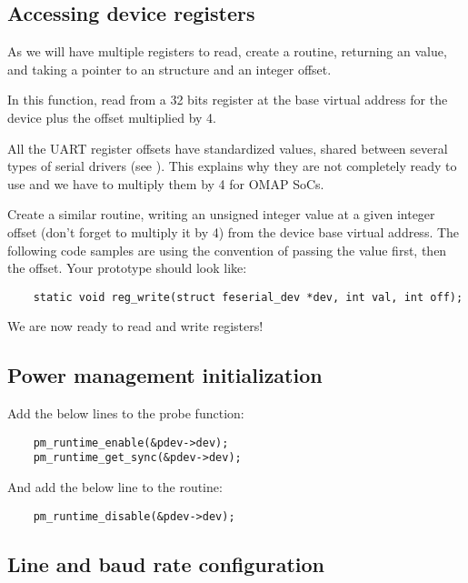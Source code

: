 \subsection{Accessing device registers}

As we will have multiple registers to read, create a 
routine, returning an  value, and  taking a 
pointer to an  structure and an  integer
offset.

In this function, read from a 32 bits register at the base virtual
address for the device plus the offset multiplied by 4.

All the UART register offsets have standardized values, shared between
several types of serial drivers (see
). This explains why they are not
completely ready to use and we have to multiply them by 4 for OMAP SoCs.

Create a similar  routine, writing an unsigned integer
value at a given integer offset (don't forget to multiply it by 4) from
the device base virtual address. The following code samples are using
the  convention of passing the value first, then the
offset. Your prototype should look like:
\begin{verbatim}
    static void reg_write(struct feserial_dev *dev, int val, int off);
\end{verbatim}

We are now ready to read and write registers!

\subsection{Power management initialization}

Add the below lines to the probe function:

\begin{verbatim}
    pm_runtime_enable(&pdev->dev);
    pm_runtime_get_sync(&pdev->dev);
\end{verbatim}

And add the below line to the  routine:

\begin{verbatim}
    pm_runtime_disable(&pdev->dev);
\end{verbatim}

\subsection{Line and baud rate configuration}

